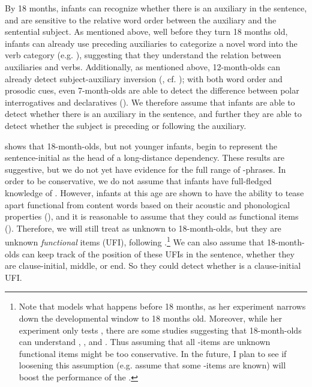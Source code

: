  By 18 months, infants can recognize whether there is an auxiliary in the sentence, and are sensitive to the relative word order between the auxiliary and the sentential subject. As mentioned above, well before they turn 18 months old, infants can already use preceding auxiliaries to categorize a novel word into the verb category (e.g. \cite{peterson2006aux, mintz2006verb}), suggesting that they understand the relation between auxiliaries and verbs. Additionally, as mentioned above, 12-month-olds can already detect subject-auxiliary inversion (\cite{geffenmintz2015wordorder}, cf. \cite{erreich1984,ambridge2006auxinvert}); with both word order and prosodic cues, even 7-month-olds are able to detect the difference between polar interrogatives and declaratives (\cite{geffenmintz2011}). We therefore assume that infants are able to detect whether there is an auxiliary in the sentence, and further they are able to detect whether the subject is preceding or following the auxiliary.

 \textcite{perkinslidz2021wh} shows that 18-month-olds, but not younger infants, begin to represent the sentence-initial  as the head of a long-distance dependency. These results are suggestive, but we do not yet have evidence for the full range of \twh-phrases. In order to be conservative, we do not assume that infants have full-fledged knowledge of \twh{}. However, infants at this age are shown to have the ability to tease apart functional from content words based on their acoustic and phonological properties (\cite{shi1999func,shi2014functional}), and it is reasonable to assume that they could   as functional items (\cite{perkins2019}). Therefore, we will still treat \twh{} as unknown to 18-month-olds, but they are unknown \emph{functional} items (UFI), following \textcite{perkins2019}.\footnote{Note that \textcite{perkins2019} models what happens before 18 months, as her experiment narrows down the developmental window to 18 months old. Moreover, while her experiment only tests , there are some studies suggesting that 18-month-olds can understand , , and  . Thus assuming that all \twh-items are unknown functional items might be too conservative. In the future, I plan to see if loosening this assumption (e.g. assume that some \twh-items are known) will boost the performance of the \dlearnerabbr{}.} We can also assume that 18-month-olds can keep track of the position of these UFIs in the sentence, whether they are clause-initial, middle, or end. So they could detect whether is a clause-initial UFI. 

